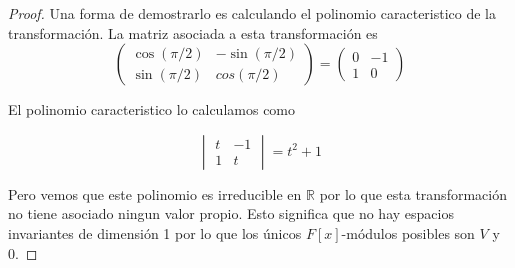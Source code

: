 \documentclass[letter,twoside,12pt]{article}
\begin{document}
\begin{proof}
Una forma de demostrarlo es calculando el polinomio caracteristico de la transformación. La matriz asociada a esta transformación es 
\begin{equation}
\begin{pmatrix}
\cos(\pi/2)  &  -\sin(\pi/2) \\
\sin(\pi/2)  &  cos(\pi/2) 
\end{pmatrix} =
\begin{pmatrix}
0  &  -1 \\
1  &  0 
\end{pmatrix}
\nonumber
\end{equation}

El polinomio caracteristico lo calculamos como

\begin{equation}
\begin{vmatrix}
t & -1 \\
1 & t
\end{vmatrix} = t^2+1 \nonumber
\end{equation}

Pero vemos que este polinomio es irreducible en $ \mathbb{R} $ por lo que esta transformación no tiene asociado ningun valor propio. Esto significa que no hay espacios invariantes de dimensión 1 por lo que los únicos $ F[x] $-módulos posibles son $ V $ y 0.
\end{proof} 
\end{document}

